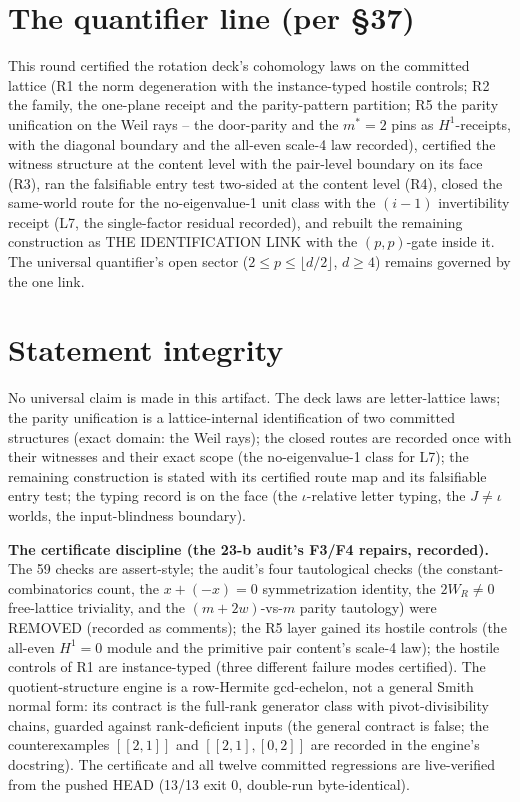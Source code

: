 \documentclass[11pt]{article}
\begin{document}
\section*{The quantifier line (per §37)}

This round certified the rotation deck's cohomology laws on the
committed lattice (R1 the norm degeneration with the instance-typed
hostile controls; R2 the family, the one-plane receipt and the
parity-pattern partition; R5 the parity unification on the Weil rays --
the door-parity and the $m^*=2$ pins as $H^1$-receipts, with the
diagonal boundary and the all-even scale-4 law recorded), certified the
witness structure at the content level with the pair-level boundary on
its face (R3), ran the falsifiable entry test two-sided at the content
level (R4), closed the same-world route for the no-eigenvalue-1 unit
class with the $(i-1)$ invertibility receipt (L7, the single-factor
residual recorded), and rebuilt the remaining construction as THE
IDENTIFICATION LINK with the $(p,p)$-gate inside it. The universal
quantifier's open sector ($2\le p\le\lfloor d/2\rfloor$, $d\ge4$)
remains governed by the one link.

\section*{Statement integrity}

No universal claim is made in this artifact. The deck laws are
letter-lattice laws; the parity unification is a lattice-internal
identification of two committed structures (exact domain: the Weil
rays); the closed routes are recorded once with their witnesses and
their exact scope (the no-eigenvalue-1 class for L7); the remaining
construction is stated with its certified route map and its falsifiable
entry test; the typing record is on the face (the $\iota$-relative
letter typing, the $J\ne\iota$ worlds, the input-blindness boundary).

\textbf{The certificate discipline (the 23-b audit's F3/F4 repairs,
recorded).} The 59 checks are assert-style; the audit's four
tautological checks (the constant-combinatorics count, the
$x+(-x)=0$ symmetrization identity, the $2W_R\ne0$ free-lattice
triviality, and the $(m+2w)$-vs-$m$ parity tautology) were REMOVED
(recorded as comments); the R5 layer gained its hostile controls (the
all-even $H^1=0$ module and the primitive pair content's scale-4 law);
the hostile controls of R1 are instance-typed (three different failure
modes certified). The quotient-structure engine is a row-Hermite
gcd-echelon, not a general Smith normal form: its contract is the
full-rank generator class with pivot-divisibility chains, guarded
against rank-deficient inputs (the general contract is false; the
counterexamples $[[2,1]]$ and $[[2,1],[0,2]]$ are recorded in the
engine's docstring). The certificate and all twelve committed
regressions are live-verified from the pushed HEAD (13/13 exit 0,
double-run byte-identical).
\end{document}
